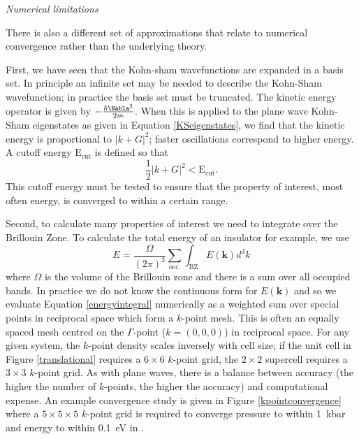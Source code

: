 \textit{Numerical limitations}

There is also a different set of approximations that relate to  numerical convergence rather than the underlying theory.

First, we have seen that the Kohn-sham wavefunctions are expanded in a basis set. In principle an infinite set may be needed to describe the Kohn-Sham wavefunction; in practice the basis set must be truncated. The kinetic energy operator is given by $-\frac{\hbar \Nabla^2}{2m}$. When this is applied to the plane wave Kohn-Sham eigenstates as given in Equation \ref{KSeigenstates}, we find that the kinetic energy is proportional to $|k+G|^2$; faster oscillations correspond to higher energy. A cutoff energy $\textrm{E}_\textrm{cut}$ is defined so that
\begin{equation}
\frac{1}{2}|k+G|^2 < \textrm{E}_\textrm{cut}.
\end{equation}
This cutoff energy must be tested to ensure that the property of interest, most often energy, is converged to within a certain range.

Second, to calculate many properties of interest we need to integrate over the Brillouin Zone. To calculate the total energy of an insulator for example, we use
\begin{equation} \label{energyintegral}
    E = \frac{\Omega}{(2\pi)^3}\sum_\textrm{occ.}\int_\textrm{BZ}E(\textbf{k})d^3k
\end{equation}
where $\Omega$ is the volume of the Brillouin zone and there is a sum over all occupied bands. 
In practice we do not know the continuous form for $E(\textbf{k})$ and so we evaluate Equation \ref{energyintegral} numerically as a weighted sum over special points in reciprocal space which form a $k$-point mesh. This is often an equally spaced mesh centred on the $\Gamma$-point ($k=(0,0,0)$) in reciprocal space. For any given system, the $k$-point density scales inversely with cell size; if the unit cell in Figure \ref{translational} requires a $6\times6$ $k$-point grid, the $2\times2$ supercell requires a $3\times3$ $k$-point grid. As with plane waves, there is a balance between accuracy (the higher the number of $k$-points, the higher the accuracy) and computational expense. An example convergence study is given in Figure \ref{kpointconvergence} where a $5\times5\times5$ $k$-point grid is required to converge pressure to within \SI{1}{\kilo\bar} and energy to within \SI{0.1}{\electronvolt} in .


